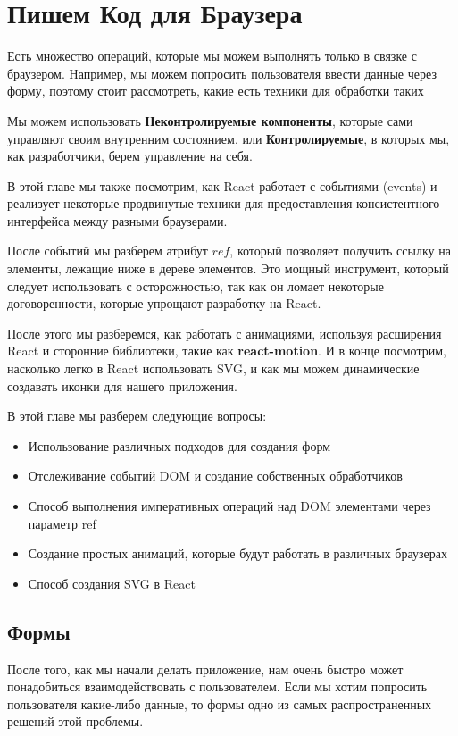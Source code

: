 \chapter{Пишем Код для Браузера}

Есть множество операций, которые мы можем выполнять только в связке с браузером. Например, мы можем попросить пользователя ввести данные через форму, поэтому стоит рассмотреть, какие есть техники для обработки таких 

Мы можем использовать \textbf{Неконтролируемые компоненты}, которые сами управляют своим внутренним состоянием, или \textbf{Контролируемые}, в которых мы, как разработчики, берем управление на себя.

В этой главе мы также посмотрим, как React работает с событиями (events) и реализует некоторые продвинутые техники для предоставления консистентного интерфейса между разными браузерами.

После событий мы разберем атрибут $ref$, который позволяет получить ссылку на элементы, лежащие ниже в дереве элементов. Это мощный инструмент, который следует использовать с осторожностью, так как он ломает некоторые договоренности, которые упрощают разработку на React.

После этого мы разберемся, как работать с анимациями, используя расширения React и сторонние библиотеки, такие как \textbf{react-motion}. И в конце посмотрим, насколько легко в React использовать SVG, и как мы можем динамические создавать иконки для нашего приложения.

В этой главе мы разберем следующие вопросы:

\begin{itemize}
  \item Использование различных подходов для создания форм
  \item Отслеживание событий DOM и создание собственных обработчиков
  \item Способ выполнения императивных операций над DOM элементами через параметр ref
  \item Создание простых анимаций, которые будут работать в различных браузерах
  \item Способ создания SVG в React
\end{itemize}


\section{Формы}

После того, как мы начали делать приложение, нам очень быстро может понадобиться взаимодействовать с пользователем. Если мы хотим попросить пользователя какие-либо данные, то формы одно из самых распространенных решений этой проблемы.

